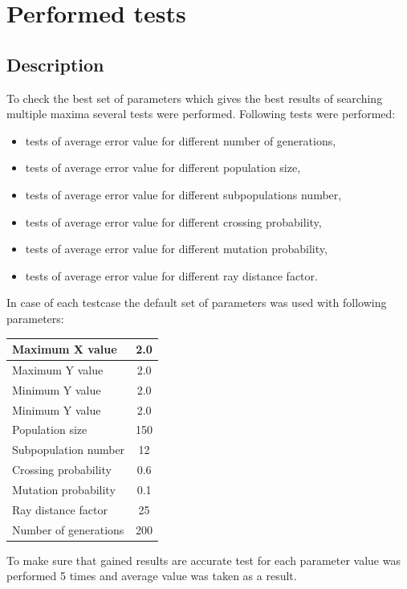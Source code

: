 \documentclass[a4paper]{article}
\begin{document}
\section{Performed tests}
\subsection{Description}
To check the best set of parameters which gives the best results of searching multiple maxima several tests were performed. Following tests were performed:
\begin{itemize}
\item tests of average error value for different number of generations,
\item tests of average error value for different population size,
\item tests of average error value for different subpopulations number,
\item tests of average error value for different crossing probability,
\item tests of average error value for different mutation probability,
\item tests of average error value for different ray distance factor.
\end{itemize}
In case of each testcase the default set of parameters was used with following parameters:
\begin{center}
  \begin{tabular}{ l | c }
    \hline
    Maximum X value & 2.0 \\ \hline
    Maximum Y value & 2.0 \\ \hline
    Minimum Y value & 2.0 \\ \hline
    Minimum Y value & 2.0 \\ \hline
    Population size & 150 \\ \hline
    Subpopulation number & 12 \\ \hline    
    Crossing probability & 0.6 \\ \hline
    Mutation probability & 0.1 \\ \hline
    Ray distance factor & 25 \\ \hline  
    Number of generations & 200 \\
    \hline
  \end{tabular}
\end{center}

To make sure that gained results are accurate test for each parameter value was performed 5 times and average value was taken as a result.
     
\end{document}
